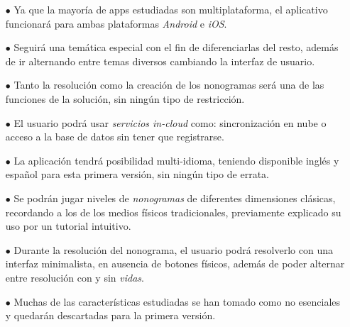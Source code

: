 \begin{itemize}
  \item[$\bullet$] Ya que la mayoría de apps estudiadas son multiplataforma, el aplicativo funcionará para ambas plataformas \textit{Android} e \textit{iOS}.
  \item[$\bullet$] Seguirá una temática especial con el fin de diferenciarlas del resto, además de ir alternando entre temas diversos cambiando
  la interfaz de usuario.
  \item[$\bullet$] Tanto la resolución como la creación de los nonogramas será una de las funciones de la solución, sin ningún tipo de restricción.
  \item[$\bullet$] El usuario podrá usar \textit{servicios in-cloud} como: sincronización en nube o acceso a la base de datos sin tener que registrarse.
  \item[$\bullet$] La aplicación tendrá posibilidad multi-idioma, teniendo disponible inglés y español para esta primera versión, sin ningún tipo de errata.
  \item[$\bullet$] Se podrán jugar niveles de \textit{nonogramas} de diferentes dimensiones clásicas, recordando a los de los medios físicos tradicionales,
  previamente explicado su uso por un tutorial intuitivo. 
  \item[$\bullet$] Durante la resolución del nonograma, el usuario podrá resolverlo con una interfaz minimalista, en ausencia de botones físicos,
  además de poder alternar entre resolución con y sin \textit{vidas}.
  \item[$\bullet$] Muchas de las características estudiadas se han tomado como no esenciales y quedarán descartadas para la primera versión.
\end{itemize}